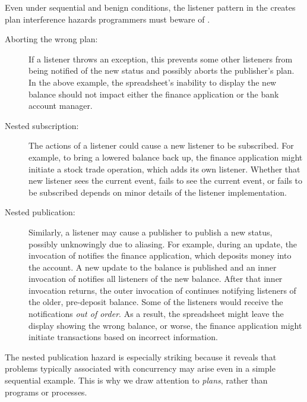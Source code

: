 \documentclass{llncs}
\begin{document}

Even under sequential and benign conditions, the listener pattern in
the  creates plan interference hazards programmers
must beware of .
%
\begin{description}

\item[Aborting the wrong plan:] 

If a listener throws an exception, this prevents some other listeners
from being notified of the new status and possibly aborts the
publisher's plan. In the above example, the spreadsheet's inability to
display the new balance should not impact either the finance
application or the bank account manager.

\item[Nested subscription:] 

The actions of a listener could cause a new listener to be subscribed.
For example, to bring a lowered balance back up, the finance
application might initiate a stock trade operation, which adds its own
listener.  Whether that new listener sees the current event, fails to
see the current event, or fails to be subscribed depends on minor
details of the listener implementation.

\item[Nested publication:] 

Similarly, a listener may cause a publisher to publish a new status,
possibly unknowingly due to aliasing.  For example, during an update,
the invocation of  notifies the finance application, which
deposits money into the account. A new update to the balance is
published and an inner invocation of  notifies all listeners
of the new balance.  After that inner invocation returns, the outer
invocation of  continues notifying listeners of the older,
pre-deposit balance.  Some of the listeners would receive the
notifications \emph{out of order}.  As a result, the spreadsheet might
leave the display showing the wrong balance, or worse, the finance
application might initiate transactions based on incorrect
information.

\end{description}
%
The nested publication hazard is especially striking because it
reveals that problems typically associated with concurrency may arise
even in a simple sequential example. This is why we draw attention to
\emph{plans}, rather than programs or processes.
\end{document}
